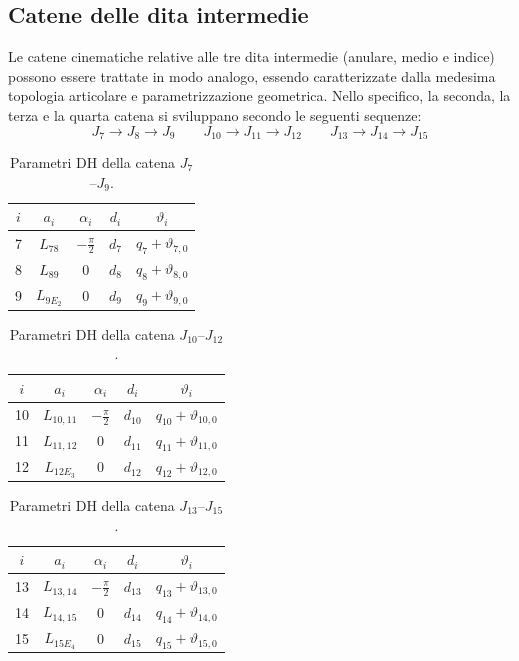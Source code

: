 \subsection{Catene delle dita intermedie}

Le catene cinematiche relative alle tre dita intermedie (anulare, medio e indice) possono essere trattate in modo analogo, essendo caratterizzate dalla medesima topologia articolare e parametrizzazione geometrica. 
Nello specifico, la seconda, la terza e la quarta catena si sviluppano secondo le seguenti sequenze:
\[
    J_7    \rightarrow J_8    \rightarrow J_9
    \qquad
    J_{10} \rightarrow J_{11} \rightarrow J_{12}
    \qquad
    J_{13} \rightarrow J_{14} \rightarrow J_{15}
\]

\begin{table}[htbp]
    \centering
    \renewcommand{\arraystretch}{1.1}
    \begin{tabular}{|c|c|c|c|c|}
        \hline
        $i$&$a_i$&$\alpha_i$&$d_i$&$\vartheta_i$\\ \hline \hline
        7&$L_{78}$&$-\frac\pi2$&$d_7$&$q_7+\vartheta_{7,0}$\\
        8&$L_{89}$&$0$&$d_8$&$q_8+\vartheta_{8,0}$\\
        9&$L_{9E_2}$&$0$&$d_9$&$q_9+\vartheta_{9,0}$\\
        \hline
    \end{tabular}
    \caption{Parametri DH della catena $J_7$--$J_9$.}
    \label{tab:dh_7_9}
\end{table}

\begin{table}[htbp]
    \centering
    \renewcommand{\arraystretch}{1.1}
    \begin{tabular}{|c|c|c|c|c|}
        \hline
        $i$&$a_i$&$\alpha_i$&$d_i$&$\vartheta_i$\\ \hline \hline
        10&$L_{10,11}$&$-\frac\pi2$&$d_{10}$&$q_{10}+\vartheta_{10,0}$\\
        11&$L_{11,12}$&$0$&$d_{11}$&$q_{11}+\vartheta_{11,0}$\\
        12&$L_{12E_3}$&$0$&$d_{12}$&$q_{12}+\vartheta_{12,0}$\\
        \hline
    \end{tabular}
    \caption{Parametri DH della catena $J_{10}$--$J_{12}$.}
    \label{tab:dh_10_12}
\end{table}

\begin{table}[htbp]
    \centering
    \renewcommand{\arraystretch}{1.1}
    \begin{tabular}{|c|c|c|c|c|}
        \hline
        $i$&$a_i$&$\alpha_i$&$d_i$&$\vartheta_i$\\ \hline \hline
        13&$L_{13,14}$&$-\frac\pi2$&$d_{13}$&$q_{13}+\vartheta_{13,0}$\\
        14&$L_{14,15}$&$0$&$d_{14}$&$q_{14}+\vartheta_{14,0}$\\
        15&$L_{15E_4}$&$0$&$d_{15}$&$q_{15}+\vartheta_{15,0}$\\
        \hline
    \end{tabular}
    \caption{Parametri DH della catena $J_{13}$--$J_{15}$.}
    \label{tab:dh_13_15}
\end{table}

